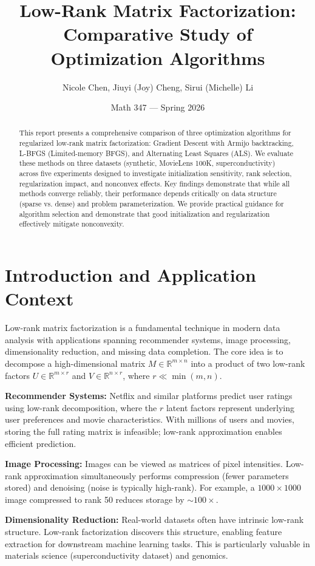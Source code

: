 \documentclass[11pt,a4paper]{article}
\title{\textbf{Low-Rank Matrix Factorization:\\ 
Comparative Study of Optimization Algorithms}}
\author{Nicole Chen, Jiuyi (Joy) Cheng, Sirui (Michelle) Li}
\date{Math 347 --- Spring 2026}
\begin{document}
\maketitle

\begin{abstract}
This report presents a comprehensive comparison of three optimization algorithms for regularized low-rank matrix factorization: Gradient Descent with Armijo backtracking, L-BFGS (Limited-memory BFGS), and Alternating Least Squares (ALS). We evaluate these methods on three datasets (synthetic, MovieLens 100K, superconductivity) across five experiments designed to investigate initialization sensitivity, rank selection, regularization impact, and nonconvex effects. Key findings demonstrate that while all methods converge reliably, their performance depends critically on data structure (sparse vs. dense) and problem parameterization. We provide practical guidance for algorithm selection and demonstrate that good initialization and regularization effectively mitigate nonconvexity.
\end{abstract}

\section{Introduction and Application Context}

Low-rank matrix factorization is a fundamental technique in modern data analysis with applications spanning recommender systems, image processing, dimensionality reduction, and missing data completion. The core idea is to decompose a high-dimensional matrix $M \in \mathbb{R}^{m \times n}$ into a product of two low-rank factors $U \in \mathbb{R}^{m \times r}$ and $V \in \mathbb{R}^{n \times r}$, where $r \ll \min(m, n)$.

\textbf{Recommender Systems:} Netflix and similar platforms predict user ratings using low-rank decomposition, where the $r$ latent factors represent underlying user preferences and movie characteristics. With millions of users and movies, storing the full rating matrix is infeasible; low-rank approximation enables efficient prediction.

\textbf{Image Processing:} Images can be viewed as matrices of pixel intensities. Low-rank approximation simultaneously performs compression (fewer parameters stored) and denoising (noise is typically high-rank). For example, a $1000 \times 1000$ image compressed to rank 50 reduces storage by $\sim 100\times$.

\textbf{Dimensionality Reduction:} Real-world datasets often have intrinsic low-rank structure. Low-rank factorization discovers this structure, enabling feature extraction for downstream machine learning tasks. This is particularly valuable in materials science (superconductivity dataset) and genomics.
\end{document}
